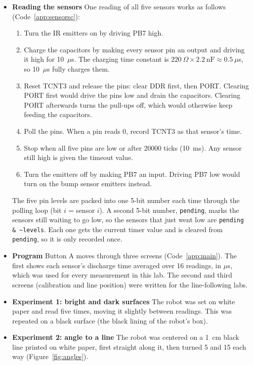 \documentclass[11pt]{article}
\begin{document}
\begin{itemize}
\item \textbf{Reading the sensors} One reading of all five sensors works as follows (Code~\ref{app:sensorsc}):
\begin{enumerate}
  \item Turn the IR emitters on by driving PB7 high.
  \item Charge the capacitors by making every sensor pin an output and driving it high for 10~$\mu$s. The charging time constant is $220~\Omega \times 2.2~\text{nF} \approx 0.5~\mu$s, so 10~$\mu$s fully charges them.
  \item Reset TCNT3 and release the pins: clear DDR first, then PORT. Clearing PORT first would drive the pins low and drain the capacitors. Clearing PORT afterwards turns the pull-ups off, which would otherwise keep feeding the capacitors.
  \item Poll the pins. When a pin reads 0, record TCNT3 as that sensor's time.
  \item Stop when all five pins are low or after 20000 ticks (10~ms). Any sensor still high is given the timeout value.
  \item Turn the emitters off by making PB7 an input. Driving PB7 low would turn on the bump sensor emitters instead.
\end{enumerate}
The five pin levels are packed into one 5-bit number each time through the polling loop (bit $i$ = sensor $i$). A second 5-bit number, \texttt{pending}, marks the sensors still waiting to go low, so the sensors that just went low are \texttt{pending \& \textasciitilde levels}. Each one gets the current timer value and is cleared from \texttt{pending}, so it is only recorded once.

\item \textbf{Program} Button A moves through three screens (Code~\ref{app:main}). The first shows each sensor's discharge time averaged over 16 readings, in $\mu$s, which was used for every measurement in this lab. The second and third screens (calibration and line position) were written for the line-following labs.

\item \textbf{Experiment 1: bright and dark surfaces} The robot was set on white paper and read five times, moving it slightly between readings. This was repeated on a black surface (the black lining of the robot's box).

\item \textbf{Experiment 2: angle to a line} The robot was centered on a 1~cm black line printed on white paper, first straight along it, then turned 5\textdegree{} and 15\textdegree{} each way (Figure~\ref{fig:angles}).


\end{itemize}
\end{document}

